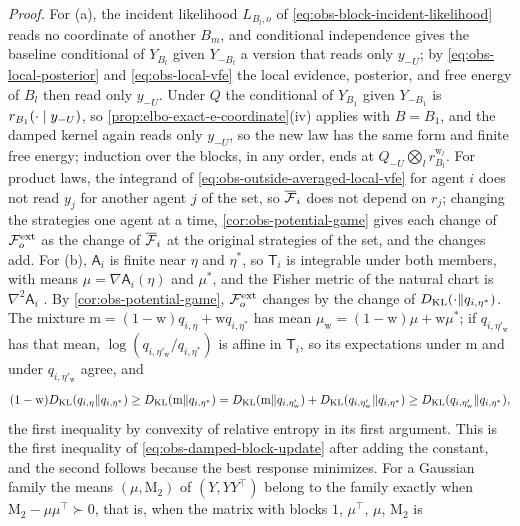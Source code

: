 \noindent\emph{Proof.}
For (a), the incident likelihood $L_{B_l,o}$ of \eqref{eq:obs-block-incident-likelihood}
reads no coordinate of another $B_m$, and conditional independence gives the baseline
conditional of $Y_{B_l}$ given $Y_{-B_l}$ a version that reads only $y_{-U}$; by
\eqref{eq:obs-local-posterior} and \eqref{eq:obs-local-vfe} the local evidence,
posterior, and free energy of $B_l$ then read only $y_{-U}$. Under $Q$ the conditional
of $Y_{B_1}$ given $Y_{-B_1}$ is $r_{B_1}(\cdot\mid y_{-U})$, so
\cref{prop:elbo-exact-e-coordinate}(iv) applies with $B=B_1$, and the damped kernel
again reads only $y_{-U}$, so the new law has the same form and finite free energy;
induction over the blocks, in any order, ends at
$Q_{-U}\bigotimes_lr^{\mathrm w_l}_{B_l}$. For product laws, the integrand of
\eqref{eq:obs-outside-averaged-local-vfe} for agent $i$ does not read $y_j$ for
another agent $j$ of the set, so $\overline{\mathcal F}_i$ does not depend on $r_j$;
changing the strategies one agent at a time, \cref{cor:obs-potential-game} gives
each change of $\mathcal F^{\mathrm{ext}}_o$ as the change of $\overline{\mathcal F}_i$ at
the original strategies of the set, and the changes add. For (b), $\mathsf A_i$ is
finite near $\eta$ and $\eta^*$, so $\mathsf T_i$ is integrable under both members,
with means $\mu=\nabla\mathsf A_i(\eta)$ and $\mu^*$, and the Fisher metric of the
natural chart is $\nabla^2\mathsf A_i$
\citep[Theorems~7.1, 7.2 and~8.1]{BarndorffNielsen1978}. By
\cref{cor:obs-potential-game}, $\mathcal F^{\mathrm{ext}}_o$ changes by the change of
$D_{\mathrm{KL}}(\cdot\Vert q_{i,\eta^*})$. The mixture
$\mathrm m=(1-\mathrm w)q_{i,\eta}+\mathrm wq_{i,\eta^*}$ has mean
$\mu_{\mathrm w}=(1-\mathrm w)\mu+\mathrm w\mu^*$; if $q_{i,\eta'_{\mathrm w}}$ has
that mean, $\log(q_{i,\eta'_{\mathrm w}}/q_{i,\eta^*})$ is affine in $\mathsf T_i$, so
its expectations under $\mathrm m$ and under $q_{i,\eta'_{\mathrm w}}$ agree, and
\[
(1-\mathrm w)D_{\mathrm{KL}}(q_{i,\eta}\Vert q_{i,\eta^*})\geq D_{\mathrm{KL}}(\mathrm m\Vert q_{i,\eta^*})
=D_{\mathrm{KL}}(\mathrm m\Vert q_{i,\eta'_{\mathrm w}})+D_{\mathrm{KL}}(q_{i,\eta'_{\mathrm w}}\Vert q_{i,\eta^*})
\geq D_{\mathrm{KL}}(q_{i,\eta'_{\mathrm w}}\Vert q_{i,\eta^*}),
\]
the first inequality by convexity of relative entropy in its first argument. This is
the first inequality of \eqref{eq:obs-damped-block-update} after adding the
constant, and the second follows because the best response minimizes. For a
Gaussian family the means $(\mu,\mathrm M_2)$ of $(Y,YY^\top)$ belong to the family exactly when
$\mathrm M_2-\mu\mu^\top\succ0$, that is, when the matrix with blocks $1$, $\mu^\top$, $\mu$, $\mathrm M_2$ is

